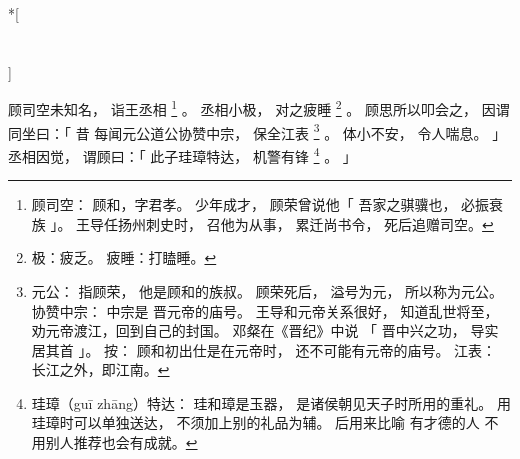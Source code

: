 
\switchcolumn[0]*[\section{}]

顾司空未知名，
诣王丞相%
\footnote{%
    顾司空：
        顾和，字君孝。
        少年成才，
        顾荣曾说他「
            吾家之骐骥也，
            必振衰族
        」。
        王导任扬州刺史时，
        召他为从事，
        累迁尚书令，
        死后追赠司空。
}%
。
丞相小极，
对之疲睡%
\footnote{%
    极：疲乏。
    疲睡：打瞌睡。
}%
。
顾思所以叩会之，
因谓同坐曰：「
    昔
    每闻元公道公协赞中宗，
    保全江表%
    \footnote{%
        元公：
            指顾荣，
            他是顾和的族叔。
            顾荣死后，
            溢号为元，
            所以称为元公。
        协赞中宗：
            中宗是
            晋元帝的庙号。
            王导和元帝关系很好，
            知道乱世将至，
            劝元帝渡江，回到自己的封国。
            邓粲在《晋纪》中说
            「
                晋中兴之功，
                导实居其首
            」。
            按：
            顾和初出仕是在元帝时，
            还不可能有元帝的庙号。
        江表：
            长江之外，即江南。
    }%
    。
    体小不安，
    令人喘息。
」
丞相因觉，
谓顾曰：「
    此子珪璋特达，
    机警有锋%
    \footnote{%
        珪璋（guī zhāng）特达：
            珪和璋是玉器，
            是诸侯朝见天子时所用的重礼。
            用珪璋时可以单独送达，
            不须加上别的礼品为辅。
            后用来比喻
            有才德的人
            不用别人推荐也会有成就。
    }%
    。
」

\switchcolumn



